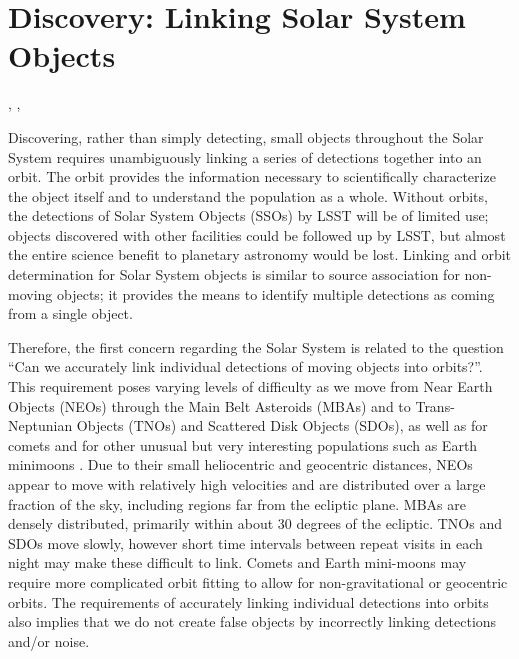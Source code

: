 %
%
%

\section{Discovery: Linking Solar System Objects}
\def\secname{\chpname:discovery}\label{sec:\secname}

,
,

Discovering, rather than simply detecting, small objects throughout
the Solar System requires unambiguously linking a series of detections
together into an orbit. The orbit provides the information necessary
to scientifically characterize the object itself and to understand the
population as a whole. Without orbits, the detections of Solar System
Objects (SSOs) by LSST will be of limited use; objects discovered with
other facilities could be followed up by LSST, but almost the entire
science benefit to planetary astronomy would be lost. Linking and
orbit determination for Solar System objects is similar to source
association for non-moving objects; it provides the means to identify
multiple detections as coming from a single object.

Therefore, the first concern regarding the Solar System is related
to the question ``Can we accurately link individual detections of moving objects into
orbits?''.  This requirement poses varying levels of difficulty as we
move from Near Earth Objects (NEOs) through the Main Belt Asteroids
(MBAs) and to Trans-Neptunian Objects (TNOs) and Scattered Disk Objects
(SDOs), as well as for comets and for other unusual but very
interesting populations such as Earth minimoons
\citep[see \eg][]{2014Icar..241..280B, 2017Icar..285...83F}.
Due to their small
heliocentric and geocentric distances, NEOs appear to move with
relatively high velocities and are distributed over a large fraction
of the sky, including regions far from the ecliptic plane. MBAs are densely distributed,
primarily within about 30 degrees of the ecliptic. TNOs and SDOs move
slowly, however short time intervals between repeat visits in each night may make these difficult
to link. Comets and Earth mini-moons may require more complicated
orbit fitting to allow for non-gravitational or geocentric
orbits. The requirements of accurately linking individual detections
into orbits also implies that we do not create false objects by
incorrectly linking detections and/or noise.

